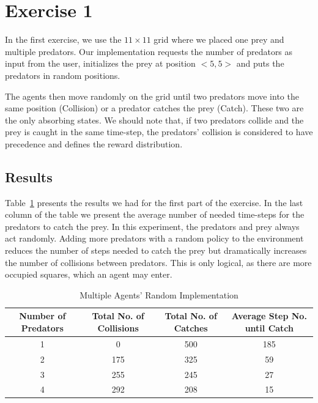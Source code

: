 \documentclass[a4paper,11pt]{article}
\begin{document}
\section{Exercise 1}

In the first exercise, we use the $11 \times 11$ grid where we placed one prey and multiple predators. Our implementation requests the number of predators as input from the user, initializes the prey at position $<5,5>$ and puts the predators in random positions. 

The agents then move randomly on the grid until two predators move into the same position (Collision) or a predator catches the prey (Catch). These two are the only absorbing states. We should note that, if two predators collide and the prey is caught in the same time-step, the predators' collision is considered to have precedence and defines the reward distribution.


\subsection{Results}
Table~\ref{table:multirandom} presents the results we had for the first part of the exercise. In the last column of the table we present the average number of needed time-steps for the predators to catch the prey. In this experiment, the predators and prey always act randomly. Adding more predators with a random policy to the environment reduces the number of steps needed to catch the prey but dramatically increases the number of collisions between predators.  This is only logical, as there are more occupied squares, which an agent may enter.
\begin{table}[h]
\begin{center}
\caption{Multiple Agents' Random Implementation}
\begin{tabular}{c c c c} 
\hline\hline               
\textbf{\small{Number of Predators}} & \textbf{\small{Total No. of Collisions}} & \textbf{\small{Total No. of Catches}} & \textbf{\small{Average Step No. until Catch}} \\  
\hline
1 & 0 & 500 & 185\\ 
2 & 175 & 325  & 59\\
3 & 255 & 245   & 27\\
4 & 292 & 208 & 15 \\ 
\end{tabular}
\label{table:multirandom} 
\end{center} 
\end{table} 
\end{document}
